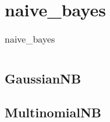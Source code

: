 \chapter{naive\_bayes\label{naivebayes}}
\begin{table}
    \centering
    \caption{naive\_bayes}
    \begin{tabular}{ll}
        \hline
        \nameref{GaussianNB} & \nameref{MultinomialNB} \\
        \hline
    \end{tabular}
\end{table}
\section{GaussianNB\label{GaussianNB}}
\section{MultinomialNB\label{MultinomialNB}}